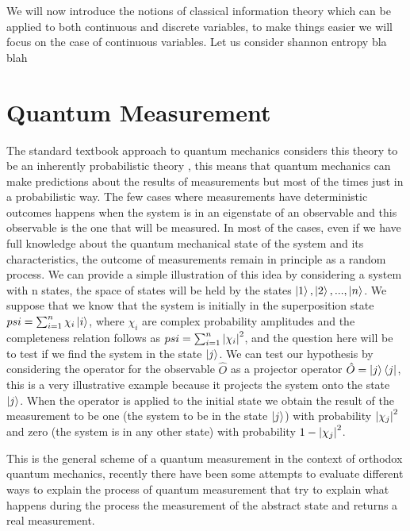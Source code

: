 We will now introduce the notions of classical information theory which can be applied to both continuous and discrete variables, to make things easier we will focus on the case of continuous variables.
Let us consider shannon entropy bla blah






\section{Quantum Measurement}
The standard textbook approach to quantum mechanics considers this theory to be an inherently probabilistic theory \cite{cohen1978quantum}\cite{messiah1981quantum}\cite{wheeler2014quantum}, this means that quantum mechanics can make predictions about the results of measurements but most of the times just in a probabilistic way. The few cases where measurements have deterministic outcomes happens when the system is in an eigenstate of an observable and this observable is the one that will be measured. In most of the cases, even if we have full knowledge about the quantum mechanical state of the system and its characteristics, the outcome of measurements remain in principle as a random process. We can provide a simple illustration of this idea by considering a system with n states, the space of states will be held by the states $\ket{1},\ket{2},...,\ket{n}$. We suppose that we know that the system is initially in the superposition state $psi=\sum_{i=1}^n \chi_i\ket{i}$, where $\chi_i$ are complex probability amplitudes and the completeness relation follows as $psi=\sum_{i=1}^n \abs{\chi_i}^2$, and the question here will be to test if we find the system in the state $\ket{j}$. We can test our hypothesis by considering the operator for the observable $\hat{O}$ as a projector operator $\hat{O}=\ket{j}\bra{j}$, this is a very illustrative example because it projects the system onto the state $\ket{j}$. When the operator is applied to the initial state we obtain the result of the measurement to be one (the system to be in the state $\ket{j}$) with probability $\abs{\chi_j}^2$ and zero (the system is in any other state) with probability $1-\abs{\chi_j}^2$.\par 
This is the general scheme of a quantum measurement in the context of orthodox quantum mechanics, recently there have been some attempts to evaluate different ways to explain the process of quantum measurement that try to explain what happens  during  the process the measurement of the abstract state and returns a real measurement.


